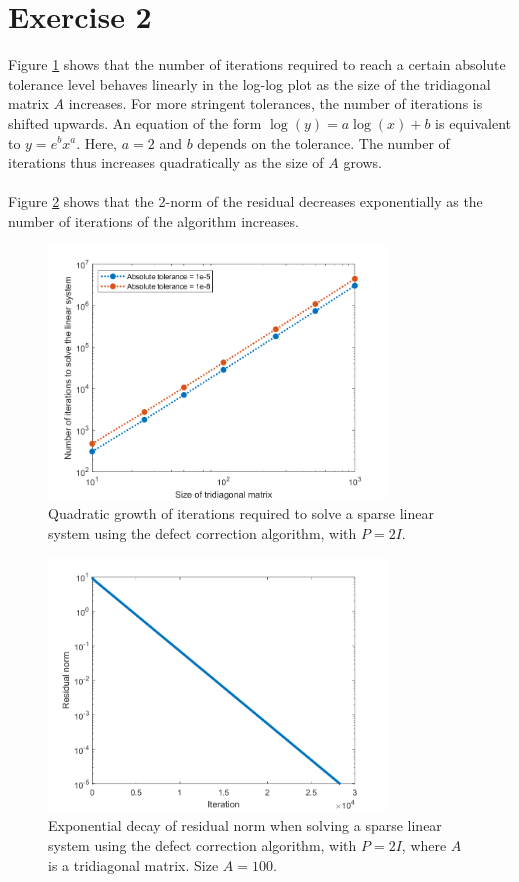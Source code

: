 \documentclass{article}
\begin{document}
\section*{Exercise 2}
Figure \ref{figex2} shows that the number of iterations required to reach a certain absolute tolerance level behaves linearly in the log-log plot as the size of the tridiagonal matrix $A$ increases. For more stringent tolerances, the number of iterations is shifted upwards. An equation of the form $\log(y) = a\log(x) + b$ is equivalent to $y = e^bx^a$. Here, $a=2$ and $b$ depends on the tolerance. The number of iterations thus increases quadratically as the size of $A$ grows.
\\
\\
Figure \ref{figex2norm} shows that the 2-norm of the residual decreases exponentially as the number of iterations of the algorithm increases.
\begin{figure}
	\centering
	\includegraphics[width=0.8\textwidth]{ex2.png}
	\caption{Quadratic growth of iterations required to solve a sparse linear system using the defect correction algorithm, with $P=2I$.}
	\label{figex2}
\end{figure}
\begin{figure}
	\centering
	\includegraphics[width=0.8\textwidth]{ex2_norm.png}
	\caption{Exponential decay of residual norm when solving a sparse linear system using the defect correction algorithm, with $P=2I$, where $A$ is a tridiagonal matrix. Size $A = 100$.}
	\label{figex2norm}
\end{figure}
\pagebreak
\end{document}
